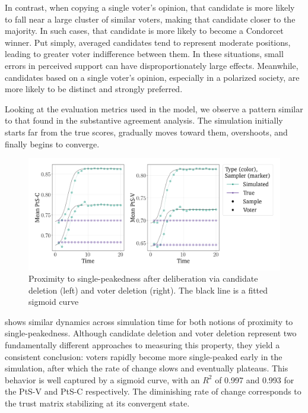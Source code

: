 In contrast, when copying a single voter's opinion, that candidate is more likely to fall near a large
cluster of similar voters, making that candidate closer to the majority. In
such cases, that candidate is more likely to become a Condorcet winner. Put
simply, averaged candidates tend to represent moderate positions, leading to
greater voter indifference between them. In these situations, small errors in
perceived support can have disproportionately large effects. Meanwhile,
candidates based on a single voter's opinion, especially in a polarized
society, are more likely to be distinct and strongly preferred.

Looking at the evaluation metrics used in the model, we observe a pattern
similar to that found in the substantive agreement analysis. The simulation
initially starts far from the true scores, gradually moves toward them,
overshoots, and finally begins to converge.

\begin{figure}[htbp]
	\centering
	\vspace{-9pt}
	\includegraphics[width=\textwidth]{Figures/pst_measures.png}
	\caption{Proximity to single-peakedness after deliberation via candidate deletion (left) and voter deletion (right). The black line is a fitted sigmoid curve}
	\label{fig:degroot_single_peaked}
\end{figure}

 shows similar dynamics across simulation time
for both notions of proximity to single-peakedness. Although candidate deletion
and voter deletion represent two fundamentally different approaches to
measuring this property, they yield a consistent conclusion: voters rapidly
become more single-peaked early in the simulation, after which the rate of
change slows and eventually plateaus. This behavior is well captured by a
sigmoid curve, with an $R^2$ of 0.997 and 0.993 for the PtS-V and PtS-C respectively. The diminishing
rate of change corresponds to the trust matrix stabilizing at its convergent
state.


